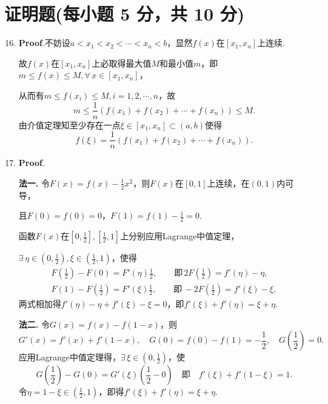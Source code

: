 \documentclass[../main.tex]{subfiles}
\begin{document}
\section{证明题(每小题 5 分，共 10 分)}
\begin{enumerate}
    \setcounter{enumi}{15}
    \item \textbf{Proof}.不妨设$a<x_{1}<x_{2}<\cdots<x_{n}<b$，显然$f(x)$在$[
                  x_{1},x_{n}]$上连续.

          故$f(x)$在$[x_{1},x_{n}]$上必取得最大值$M$和最小值$m$，即$m\leq f(x)\leq M,\forall\,x\in[x_{1},x_{n}]$，

          从而有$m\leq f(x_{i})\leq M,i=1,2,\cdots,n$，故
          \[
              m\leq\frac{1}{n}\left(f(x_{1})+f(x_{2})+\cdots+f(x_{n})\right)\leq M.
          \]
          由介值定理知至少存在一点$\xi\in[x_{1},x_{n}]\subset(a,b)$使得
          \[
              f(\xi)=\frac{1}{n}\left(f(x_{1})+f(x_{2})+\cdots+f(x_{n})\right).
          \]

    \item \textbf{Proof}.

          \textbf{法一.} 令$F(x)=f(x)-\frac{1}{2}x^{2}$，则$F(x)$在$[0,1]$上连续，在$(0,1)$内可导，

          且$F(0)=f(0)=0$，$F(1)=f(1)-\frac{1}{2}=0$.

          函数$F(x)$在$\left[0,\frac{1}{2}\right],\left[\frac{1}{2},1\right]$上分别应用Lagrange中值定理，

          $\exists\,\eta\in\left(0,\frac{1}{2}\right),\xi\in\left(\frac{1}{2},1\right)$，使得
          \[
              \begin{gathered}
                  F\left(\frac{1}{2}\right)-F(0)=F'(\eta)\frac{1}{2},\qquad\text{即}\,2F\left(\frac{1}{2}\right)=f'(\eta)-\eta,\\
                  F(1)-F\left(\frac{1}{2}\right)=F'(\xi)\frac{1}{2},\qquad\text{即}\,-2F\left(\frac{1}{2}\right)=f'(\xi)-\xi,
              \end{gathered}
          \]
          两式相加得$f'(\eta)-\eta+f'(\xi)-\xi=0$，即$f'(\xi)+f'(\eta)=\xi+\eta$.

          \textbf{法二.} 令$G(x)=f(x)-f(1-x)$，则
          \[
              G'(x)=f'(x)+f'(1-x),\quad G(0)=f(0)-f(1)=-\frac{1}{2},\quad G\left(\frac{1}{2}
              \right)=0.
          \]
          应用Lagrange中值定理得，$\exists\,\xi\in\left(0,\frac{1}{2}\right)$，使
          \[
              G\left(\frac{1}{2}\right)-G(0)=G'(\xi)\left(\frac{1}{2}-0\right)\quad\text{即}
              \quad f'(\xi)+f'(1-\xi)=1.
          \]
          令$\eta=1-\xi\in\left(\frac{1}{2},1\right)$，即得$f'(\xi)+f'(\eta)=\xi+\eta$.
\end{enumerate}
\end{document}
